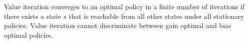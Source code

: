 Value iteration converges to an optimal policy in a finite number of iterations if there exists a state $s$ that is reachable from all other states under all stationary policies.
Value iteration cannot discriminate between gain optimal and bias optimal policies.


